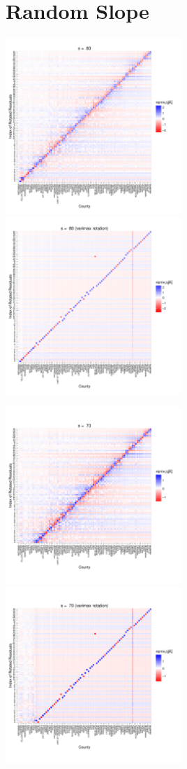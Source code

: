 \documentclass{article} %
\begin{document}
\section*{Random Slope}
\includegraphics[width=0.5\textwidth]{RandomSlope_s80.pdf}
\includegraphics[width=0.5\textwidth]{RandomSlope_s80_varimax.pdf}
 
\includegraphics[width=0.5\textwidth]{RandomSlope_s70.pdf}
\includegraphics[width=0.5\textwidth]{RandomSlope_s70_varimax.pdf}
\end{document}

